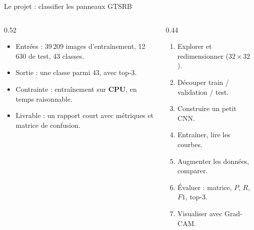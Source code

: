 \begin{frame}{Le projet : classifier les panneaux GTSRB}
\begin{columns}[t]
\begin{column}{0.52\textwidth}
\begin{abox}
\begin{itemize}
  \item Entrées : 39\,209 images d'entraînement, 12\,630 de test, 43 classes.
  \item Sortie : une classe parmi 43, avec top-3.
  \item Contrainte : entraînement sur \textbf{CPU}, en temps raisonnable.
  \item Livrable : un rapport court avec métriques et matrice de confusion.
\end{itemize}
\end{abox}
\end{column}
\begin{column}{0.44\textwidth}
\begin{kbox}
\begin{enumerate}
  \item Explorer et redimensionner ($32\times32$).
  \item Découper train / validation / test.
  \item Construire un petit CNN.
  \item Entraîner, lire les courbes.
  \item Augmenter les données, comparer.
  \item Évaluer : matrice, $P$, $R$, $F1$, top-3.
  \item Visualiser avec Grad-CAM.
\end{enumerate}
\end{kbox}
\end{column}
\end{columns}
\end{frame}


